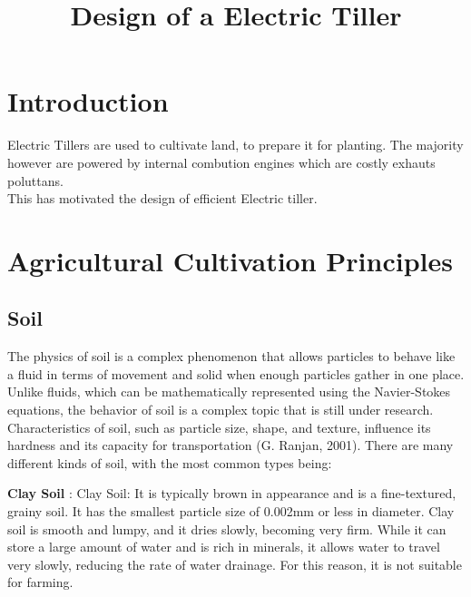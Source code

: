 \documentclass{article}
\title{Design of a Electric Tiller }
\begin{document}
\maketitle

\begin{flushleft}
\section{Introduction}
Electric Tillers are used to cultivate land, to prepare it for planting. 
The majority however are powered by internal combution engines which are costly
exhauts poluttans.\\
This has motivated the design of efficient Electric tiller. 


\section*{Agricultural Cultivation Principles}
\subsection*{Soil}
The physics of soil is a complex phenomenon that allows particles to behave like a fluid in terms of movement and solid when enough particles gather in one place. 
Unlike fluids, which can be mathematically represented using the Navier-Stokes equations, the behavior of soil is a complex topic that is still under research.
Characteristics of soil, such as particle size, shape, and texture, influence its hardness and its capacity for transportation (G. Ranjan, 2001). \newline
There are many different kinds of soil, with the most common types being:
\newline


\vspace*{5pt}

\textbf{Clay Soil }: Clay Soil: It is typically brown in appearance and is a fine-textured, grainy soil. 
It has the smallest particle size of 0.002mm or less in diameter. Clay soil is smooth and lumpy, and it dries slowly, becoming very firm. 
While it can store a large amount of water and is rich in minerals, it allows water to travel very slowly, reducing the rate of water drainage. 
For this reason, it is not suitable for farming.
\newline
\vspace*{3pt}


\end{flushleft}
\end{document}
